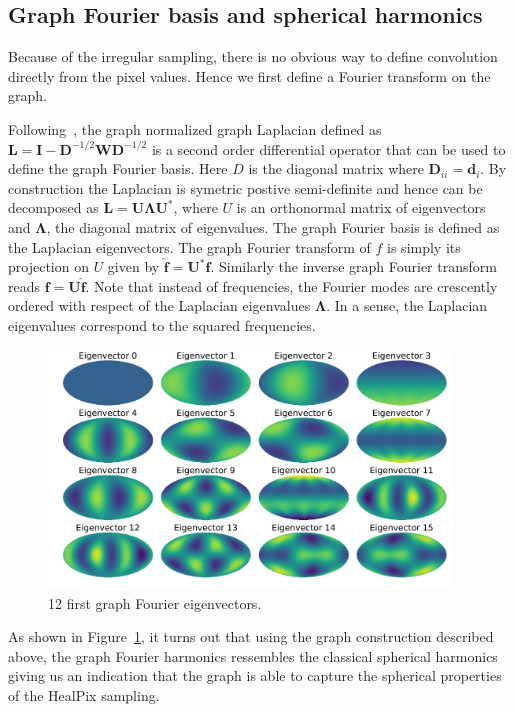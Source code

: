 \documentclass[preprint,12pt,authoryear]{elsarticle}
\newcommand{\todo}[1]{{\color[rgb]{.6,.1,.6}{#1}}}
\renewcommand{\b}[1]{{\bm{#1}}}   %
\newcommand{\1}{\b{1}}              %
\newcommand{\0}{\b{0}}              %
\renewcommand{\L}{\b{L}} %
\newcommand{\W}{\b{W}}
\newcommand{\I}{\b{I}}
\newcommand{\D}{\b{D}}
\newcommand{\U}{\b{U}}
\newcommand{\bLambda}{\b{\Lambda}}
\begin{document}
\subsection{Graph Fourier basis and spherical harmonics}
\todo{Add a few extra references}

Because of the irregular sampling, there is no obvious way to define convolution
directly from the pixel values. Hence we first define a Fourier transform on the
graph.

Following~\cite{shuman2013emerging}, the graph normalized graph Laplacian
defined as $\L = \I - \D^{-1/2} \W \D^{-1/2}$ is a second order differential operator
that can be used to define the graph Fourier basis. Here $D$ is the diagonal
matrix where $\D_{ii}=\b{d}_i$. By construction the Laplacian is symetric postive
semi-definite and hence can be decomposed as $\L=\U \bLambda \U^*$, where $U$ is an
orthonormal matrix of eigenvectors and $\bLambda$, the diagonal matrix of
eigenvalues. The graph Fourier basis is defined as the Laplacian eigenvectors.
The graph Fourier transform of $f$ is simply its projection on $U$ given by 
$\hat{\b{f}}=\U^*\b{f}$. Similarly the inverse graph Fourier transform reads $\b{f}=\U\hat{\b{f}}$.
Note that instead of frequencies, the Fourier modes are crescently ordered with
respect of the Laplacian eigenvalues $\bLambda$. In a sense, the Laplacian
eigenvalues correspond to the squared frequencies. 

\begin{figure}[!ht]
\centering
\includegraphics[width=0.95\textwidth]{figures/eigenvectors.pdf}
\caption{12 first graph Fourier eigenvectors.}
\label{fig:graph_harmonics}
\end{figure}

As shown in Figure~\ref{fig:graph_harmonics}, it turns out that using the graph
construction described above, the graph Fourier harmonics ressembles the
classical spherical harmonics giving us an indication that the graph is able to
capture the spherical properties of the HealPix sampling.
\end{document}
